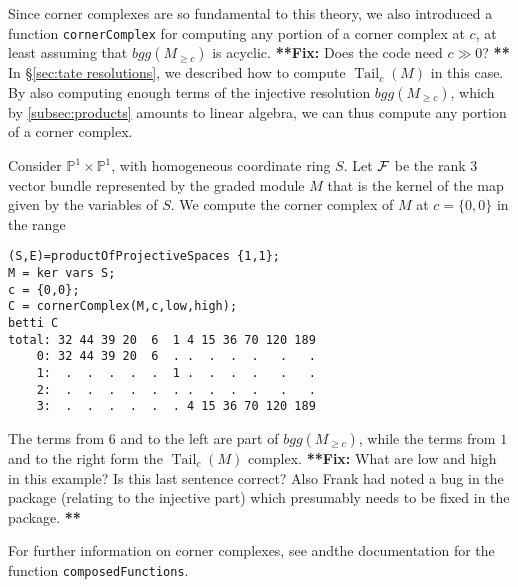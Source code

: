 \documentclass[twoside,12pt, leqno]{amsart}
\def\PP{{\mathbb P}}
\def\cornerT#1{{T_{\Rsh \kern -1pt #1}}}
\def\fix#1{{\bf ***Fix:} #1 {\bf ***}}
\def\bT{{\bf T}}
\begin{document}
Since corner complexes are so fundamental to this theory, we also introduced a function {\tt cornerComplex} for computing any portion of a corner complex at $c$, at least assuming that $bgg(M_{\geq c})$ is acyclic.  \fix{Does the code need $c\gg 0$?}  In \S\ref{sec:tate resolutions}, we described how to compute $\operatorname{Tail}_c(M)$ in this case.  By also computing enough terms of the injective resolution $bgg(M_{\geq c})$, which by \ref{subsec:products} amounts to linear algebra, we can thus compute any portion of a corner complex.   


\begin{example}
Consider 
$\PP^1\times \PP^1$, with homogeneous coordinate ring $S$.
Let ${\mathcal F}$ be the rank $3$ vector bundle represented by the graded module
$M$ that is the kernel of the map given by the variables of $S$.
We compute the corner complex of $M$ at $c=\{0,0\}$ in the range 
{\small 
\begin{verbatim}
(S,E)=productOfProjectiveSpaces {1,1};
M = ker vars S;
c = {0,0};
C = cornerComplex(M,c,low,high);
betti C
total: 32 44 39 20  6  1 4 15 36 70 120 189
    0: 32 44 39 20  6  . .  .  .  .   .   .
    1:  .  .  .  .  .  1 .  .  .  .   .   .
    2:  .  .  .  .  .  . .  .  .  .   .   .
    3:  .  .  .  .  .  . 4 15 36 70 120 189 
\end{verbatim}
}
The terms from $6$ and to the left are part of $bgg(M_{\geq c})$, while the terms from $1$ and to the right form the $\operatorname{Tail}_c(M)$ complex.
\fix{What are low and high in this example?  Is this last sentence correct?  Also Frank had noted a bug in the package (relating to the injective part) which presumably needs to be fixed in the package.}
\end{example}
For further information on corner complexes, see \cite[\S3]{EES} andthe documentation for the function  {\tt composedFunctions}.

%
%
% 
\end{document}
